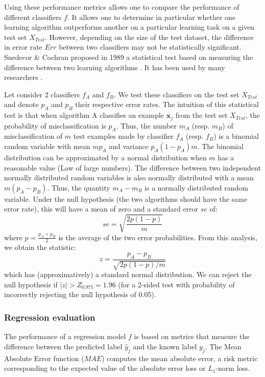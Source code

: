 Using these performance metrics allows one to compare the performance of different classifiers $f$. It allows one to determine in particular whether one learning algorithm outperforms another on a particular learning task on a given test set $X_{Test}$. However, depending on the size of the test dataset, the difference in error rate $Err$ between two classifiers may not be statistically significant. Snedecor \& Cochran proposed in 1989 a statistical test based on measuring the difference between two learning algorithms \cite{Cochran1977}. It has been used by many researchers \cite{Dietterich1997,Dietterich1995}.

Let consider 2 classifiers $f_A$ and $f_B$. We test these classifiers on the test set $X_{Test}$ and denote $p_A$ and $p_B$ their respective error rates. The intuition of this statistical test is that when algorithm A classifies an example $\textbf{x}_j$ from the test set $X_{Test}$, the probability of misclassification is $p_A$. Thus, the number $m_A$ (resp. $m_B$) of misclassification of $m$ test examples made by classifier $f_A$ (resp. $f_B$) is a binomial random variable with mean $mp_A$ and variance $p_A(1-p_A)m$. The binomial distribution can be approximated by a normal distribution when $m$ has a reasonable value (Law of large numbers). The difference between two independent normally distributed random variables is also normally distributed with a mean $m(p_A-p_B)$. Thus, the quantity $m_A-m_B$ is a normally distributed random variable. Under the null hypothesis (the two algorithms should have the same error rate), this will have a mean of zero and a standard error $se$ of:
\begin{equation}
se = \sqrt{\frac{2p(1-p)}{m}}
\end{equation}
\noindent where $p=\frac{p_A+p_B}{2}$ is the average of the two error probabilities. From this analysis, we obtain the statistic:
\begin{equation}
z=\frac{p_A-p_B}{\sqrt{2p(1-p)/m}}
\end{equation}
\noindent which has (approximatively) a standard normal distribution. We can reject the null hypothesis if $|z| > Z_{0.975} = 1.96$ (for a 2-sided test with probability of incorrectly rejecting the null hypothesis of 0.05).


\subsubsection{Regression evaluation}
The performance of a regression model $f$ is based on metrics that measure the difference between the predicted label $\hat{y}_j$ and the known label $y_j$. The Mean Absolute Error function ($MAE$) computes the mean absolute error, a risk metric corresponding to the expected value of the absolute error loss or $L_1$-norm loss.

